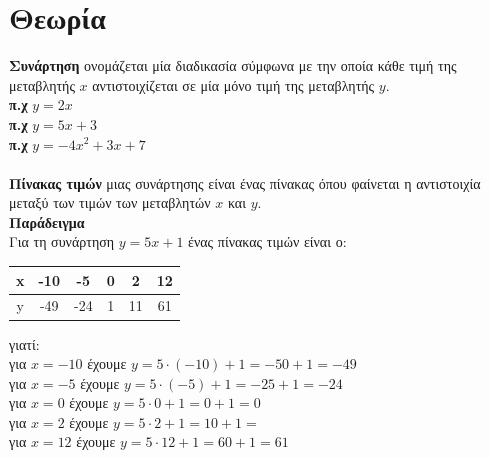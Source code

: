 \documentclass[a4paper,10pt]{report}
\begin{document}
\section*{Θεωρία \hfill \small{}}
\textbf{Συνάρτηση} ονομάζεται μία διαδικασία σύμφωνα με την οποία κάθε τιμή της μεταβλητής $x$ 
       αντιστοιχίζεται σε μία μόνο τιμή της μεταβλητής $y$.\\ 
\textbf{π.χ} $y=2x$\\
\textbf{π.χ} $y=5x+3$\\
\textbf{π.χ} $y=-4x^{2}+3x+7$ \\ \\
\textbf{Πίνακας τιμών} μιας συνάρτησης είναι ένας πίνακας όπου φαίνεται η αντιστοιχία μεταξύ 
των τιμών των μεταβλητών $x$ και $y$.\\
\textbf{Παράδειγμα}\\
Για τη συνάρτηση $y=5x+1$ ένας πίνακας τιμών είναι ο:
\begin{center}
 \begin{tabular}{|c|c|c|c|c|c|}\hline 
x        &  -10   &   -5  &  0  &   2  & 12  \\
\hline 
y        &  -49   &   -24  &  1 &  11  & 61  \\
\hline 
\end{tabular}
\end{center}
γιατί: \\
για $x=-10$ έχουμε $y=5\cdot (-10)+1=-50+1=-49$\\
για $x=-5$ έχουμε  $y=5\cdot (-5)+1=-25+1=-24$\\
για $x=0$ έχουμε $y=5\cdot0+1=0+1=0$\\
για $x=2$ έχουμε $y=5\cdot 2+1=10+1=$\\
για $x=12$ έχουμε $y=5\cdot 12+1=60+1=61$
\end{document}
